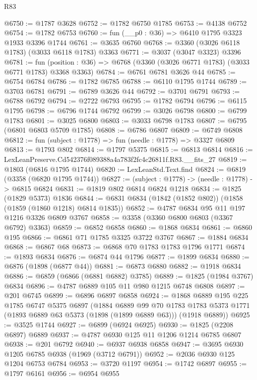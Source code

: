 \begin{lexlean}{R83}
\begin{coremodule}
@6750 := @1787 @3628
@6752 := @1782 @6750 @1785
@6753 := @4138 @6752
@6754 := @1782 @6753
@6760 := fun (__p0 : @36) => @6410 @1795 @3323 @1933 @3396 @1744
@6761 := @3635 @6760
@6768 := @3360 (@3026 @6118 @1783) (@3033 @6118 @1783) @3363
@6771 := @3037 (@3047 @3323) @3396
@6781 := fun (position : @36) => @6768 (@3360 (@3026 @6771 @1783) (@3033 @6771 @1783) @3368 @3363)
@6784 := @6761 @6781 @3626 @44
@6785 := @6754 @6784
@6786 := @1782 @6785
@6788 := @6110 @1795 @1744
@6789 := @3703 @6781
@6791 := @6789 @3626 @44
@6792 := @3701 @6791
@6793 := @6788 @6792
@6794 := @2722 @6793
@6795 := @1782 @6794
@6796 := @6115 @1795
@6798 := @6796 @1744 @6792
@6799 := @3026 @6798
@6800 := @6799 @1783
@6801 := @3025 @6800
@6803 := @3033 @6798 @1783
@6807 := @6795 (@6801 @6803 @5709 @1785)
@6808 := @6786 @6807
@6809 := @6749 @6808
@6812 := fun (subject : @1778) => fun (needle : @1778) => @3327 @6809
@6813 := @1793 @802
@6814 := @1797 @5375
@6815 := @6813 @6814
@6816 := LexLeanPreserve.Cd542376f089388a4a783f2fc4c26811f.R83.__fits_27
@6819 := @1803 (@6816 @1795 @1744)
@6820 := LexLeanStd.Text.find
@6824 := @6819 (@3358 (@6820 @1795 @1744))
@6827 := (subject : @1778) -> (needle : @1778) -> @6815 @6824
@6831 := @1819 @802 @6814 @6824 @1218
@6834 := @1825 (@1829 @5373) @1836
@6844 := @6831 @6834 (@1842 (@1852 @802)) (@1858 (@1859 (@1860 @1218) @6814 @1835))
@6852 := @4787 @6834 @95 @11 @197 @1216 @3326 @6809 @3767
@6858 := @3358 (@3360 @6800 @6803 (@3367 @6792) @3363)
@6859 := @6852 @6858
@6860 := @1868 @6834
@6861 := @6860 @195
@6866 := @6861 @71 @1785 @3325 @3722 @3767
@6867 := @1884 @6834
@6868 := @6867 @68
@6873 := @6868 @70 @1783 @1783 @1796 @1771
@6874 := @1893 @6834
@6876 := @6874 @44 @1796
@6877 := @1899 @6834
@6880 := @6876 (@1898 (@6877 @44))
@6881 := @6873 @6880
@6882 := @1918 @6834
@6886 := @6859 (@6866 (@6881 @6882) @3785)
@6889 := @1825 (@1984 @3767) @6834
@6896 := @4787 @6889 @105 @11 @980 @1215 @6748 @6808
@6897 := @201 @6745
@6899 := @6896 @6897 @6858
@6924 := @1868
    @6889
    @195
    @225
    @1785
    @6747
    @5375
    @6897
    (@1884
      @6889
      @99
      @70
      @1783
      @1783
      @5373
      @1771
      (@1893 @6889 @63 @5373 (@1898 (@1899 @6889 @63)))
      (@1918 @6889))
@6925 := @3525 @1744
@6927 := @6899 (@6924 @6925)
@6930 := @1825 (@2208 @6897) @6889
@6937 := @4787 @6930 @125 @11 @1206 @1214 @6785 @6807
@6938 := @201 @6792
@6940 := @6937 @6938 @6858
@6947 := @3695 @6930 @1205 @6785 @6938 (@1969 (@3712 @6791))
@6952 := @2036 @6930 @125 @1204 @6753 @6784
@6953 := @3720 @1197
@6954 := @1742 @6897
@6955 := @1797 @6161
@6956 := @6954 @6955

\end{coremodule}
\end{lexlean}
